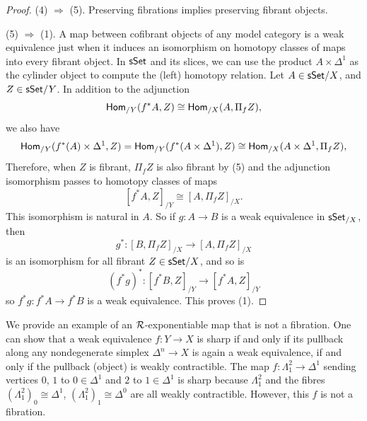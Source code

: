 \begin{example}
\begin{proof}
    (4) $\Rightarrow$ (5).
    Preserving fibrations implies preserving fibrant objects.

    (5) $\Rightarrow$ (1).
    A map between cofibrant objects of any model category is a weak equivalence
    just when it induces an isomorphism on
    homotopy classes of maps into every fibrant object.
    In $\mathsf{sSet}$ and its slices, we can use the product $A \times \Delta^1$
    as the cylinder object to compute the (left) homotopy relation.
    Let $A \in \mathsf{sSet}/X$, and $Z \in \mathsf{sSet}/Y$.
    In addition to the adjunction
    \[
      \mathsf{Hom}_{/Y}(f^* A, Z) \cong \mathsf{Hom}_{/X}(A, \Pi_f Z),
    \]
    we also have
    \[
      \mathsf{Hom}_{/Y}(f^*(A) \times \Delta^1, Z) =
      \mathsf{Hom}_{/Y}(f^*(A \times \Delta^1), Z) \cong \mathsf{Hom}_{/X}(A \times \Delta^1, \Pi_f Z),
    \]
    Therefore, when $Z$ is fibrant, $\Pi_f Z$ is also fibrant by (5)
    and the adjunction isomorphism passes to homotopy classes of maps
    \[
      [f^* A, Z]_{/Y} \cong [A, \Pi_f Z]_{/X}.
    \]
    This isomorphism is natural in $A$.
    So if $g : A \to B$ is a weak equivalence in $\mathsf{sSet}_{/X}$,
    then 
    \[g^* : [B, \Pi_f Z]_{/X} \to [A, \Pi_f Z]_{/X}\]
    is an isomorphism for all fibrant $Z \in \mathsf{sSet}/X$,
    and so is \[(f^*g)^* : [f^* B, Z]_{/Y} \to [f^* A, Z]_{/Y}\]
    so $f^*g : f^* A \to f^* B$ is a weak equivalence.
    This proves (1).
  \end{proof}
  
  We provide an example of an $\mathcal{R}$-exponentiable map that is not a fibration.
  One can show that a weak equivalence $f : Y \to X$ is sharp
  if and only if its pullback along
  any nondegenerate simplex $\Delta^n \to X$ is again a weak equivalence,
  if and only if the pullback (object) is weakly contractible.
  The map $f : \Lambda^2_1 \to \Delta^1$
  sending vertices $0$, $1$ to $0 \in \Delta^1$ and $2$ to $1 \in \Delta^1$
  is sharp because $\Lambda^2_1$ and the fibres $(\Lambda^2_1)_0 \cong \Delta^1$,
  $(\Lambda^2_1)_1 \cong \Delta^0$ are all weakly contractible.
  However, this $f$ is not a fibration.
\end{example}

